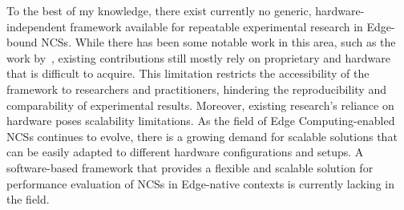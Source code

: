 To the best of my knowledge, there exist currently no generic, hardware-independent framework available for repeatable experimental research in Edge-bound \glspl{NCS}.
While there has been some notable work in this area, such as the work by~\cite{zoppi2020ncsbench}, existing contributions still mostly rely on proprietary and hardware that is difficult to acquire.
This limitation restricts the accessibility of the framework to researchers and practitioners, hindering the reproducibility and comparability of experimental results.
Moreover, existing research's reliance on hardware poses scalability limitations.
As the field of Edge Computing-enabled \glspl{NCS} continues to evolve, there is a growing demand for scalable solutions that can be easily adapted to different hardware configurations and setups.
A software-based framework that provides a flexible and scalable solution for performance evaluation of \glspl{NCS} in Edge-native contexts is currently lacking in the field.
